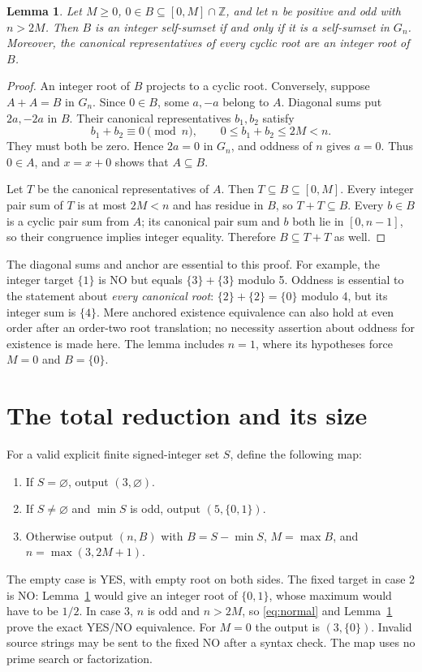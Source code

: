 \documentclass[11pt]{article}
\newtheorem{lemma}{Lemma}
\newcommand{\Z}{\mathbb Z}
\begin{document}
\begin{lemma}\label{lem:lift}
Let $M\geq0$, $0\in B\subseteq[0,M]\cap\Z$, and let $n$ be positive and odd with $n>2M$. Then $B$ is an integer self-sumset if and only if it is a self-sumset in $G_n$. Moreover, the canonical representatives of every cyclic root are an integer root of $B$.
\end{lemma}
\begin{proof}
An integer root of $B$ projects to a cyclic root. Conversely, suppose $A+A=B$ in $G_n$. Since $0\in B$, some $a,-a$ belong to $A$. Diagonal sums put $2a,-2a$ in $B$. Their canonical representatives $b_1,b_2$ satisfy
\[
 b_1+b_2\equiv0\pmod n,\qquad 0\leq b_1+b_2\leq2M<n.
\]
They must both be zero. Hence $2a=0$ in $G_n$, and oddness of $n$ gives $a=0$. Thus $0\in A$, and $x=x+0$ shows that $A\subseteq B$.

Let $T$ be the canonical representatives of $A$. Then $T\subseteq B\subseteq[0,M]$. Every integer pair sum of $T$ is at most $2M<n$ and has residue in $B$, so $T+T\subseteq B$. Every $b\in B$ is a cyclic pair sum from $A$; its canonical pair sum and $b$ both lie in $[0,n-1]$, so their congruence implies integer equality. Therefore $B\subseteq T+T$ as well.
\end{proof}

The diagonal sums and anchor are essential to this proof. For example, the integer target $\{1\}$ is NO but equals $\{3\}+\{3\}$ modulo 5. Oddness is essential to the statement about \emph{every canonical root}: $\{2\}+\{2\}=\{0\}$ modulo 4, but its integer sum is $\{4\}$. Mere anchored existence equivalence can also hold at even order after an order-two root translation; no necessity assertion about oddness for existence is made here. The lemma includes $n=1$, where its hypotheses force $M=0$ and $B=\{0\}$.

\section{The total reduction and its size}
For a valid explicit finite signed-integer set $S$, define the following map:
\begin{enumerate}
\item If $S=\varnothing$, output $(3,\varnothing)$.
\item If $S\ne\varnothing$ and $\min S$ is odd, output $(5,\{0,1\})$.
\item Otherwise output $(n,B)$ with $B=S-\min S$, $M=\max B$, and $n=\max(3,2M+1)$.
\end{enumerate}
The empty case is YES, with empty root on both sides. The fixed target in case 2 is NO: Lemma~\ref{lem:lift} would give an integer root of $\{0,1\}$, whose maximum would have to be $1/2$. In case 3, $n$ is odd and $n>2M$, so \eqref{eq:normal} and Lemma~\ref{lem:lift} prove the exact YES/NO equivalence. For $M=0$ the output is $(3,\{0\})$. Invalid source strings may be sent to the fixed NO after a syntax check. The map uses no prime search or factorization.
\end{document}

